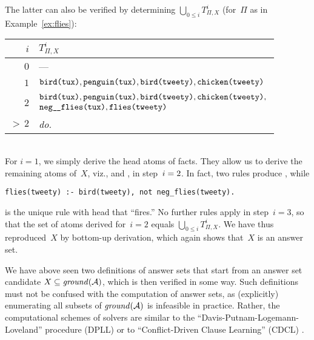 \begin{example}
The latter can also be verified by determining $\bigcup_{0\leq i}T^i_{\Pi,X}$
(for~$\Pi$ as in Example~\ref{ex:flies}):
\begin{tabular}{@{}r||l}
$i$ & $T^i_{\Pi,X}$
\\\hline\hline
$0$ &
---
\\\hline
$1$ &
$
\begin{array}{@{}l}
\code{\pred{bird}(\const{tux})},
\code{\pred{penguin}(\const{tux})},
\code{\pred{bird}(\const{tweety})},
\code{\pred{chicken}(\const{tweety})}
\end{array}
$
\\\hline
$2$  & 
$
\begin{array}{@{}l@{}}
\code{\pred{bird}(\const{tux})},
\code{\pred{penguin}(\const{tux})},
\code{\pred{bird}(\const{tweety})},
\code{\pred{chicken}(\const{tweety})},\\
\code{\pred{neg\mus flies}(\const{tux})},
\code{\pred{flies}(\const{tweety})}
\end{array}
$
\\\hline
${>\,}2$ &
\textit{do.}
\end{tabular}
\\

\noindent
For $i=1$, we simply derive the head atoms of facts.
They allow us to derive the remaining atoms of~$X$, viz.,
 and
, in step~$i=\nolinebreak2$.
In fact, two rules produce ,
while
\begin{lstlisting}[numbers=none]
flies(tweety) :- bird(tweety), not neg_flies(tweety).
\end{lstlisting}
is the unique rule with head  that ``fires.''
No further rules apply in step~$i=3$,
so that the set of atoms derived for~$i=2$ equals $\bigcup_{0\leq i}T^i_{\Pi,X}$.
We have thus reproduced~$X$ by bottom-up derivation,
which again shows that~$X$ is an answer set.
\eexample
\end{example}

We have above seen two definitions of answer sets that start
from an answer set candidate $X\subseteq\mathit{ground}(\mathcal{A})$,
which is then verified in some way.
Such definitions must not be confused with the computation of answer sets,
as (explicitly) enumerating all subsets of $\mathit{ground}(\mathcal{A})$
is infeasible in practice.
Rather, the computational schemes of solvers are similar
to the ``Davis-Putnam-Logemann-Loveland'' procedure (DPLL) \cite{dalolo62a,davput60}
or to ``Conflict-Driven Clause Learning'' (CDCL) \cite{marsak99a,mitchell05a,momazhzhma01a}.

